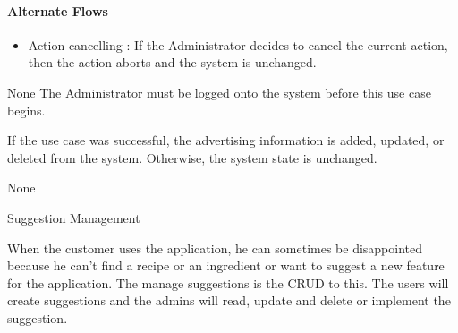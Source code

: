 {  \paragraph{Alternate Flows}
  \begin{itemize}
    \item Action cancelling : If the Administrator decides to cancel the current action, then the action aborts and the system is unchanged.
  \end{itemize}
}
{
  None
}
{
  The Administrator must be logged onto the system before this use case begins.
}
{
  If the use case was successful, the advertising information is added, updated, or deleted from the system. Otherwise, the system state is unchanged.

}
{
  None
}

\usecasedesc
{
  Suggestion Management \label{sec:suggestionManagement}
}
{
  When the customer uses the application, he can sometimes be disappointed because he can’t find a recipe or an ingredient or want to suggest a new feature for the application. The manage suggestions is the CRUD to this. The users will create suggestions and the admins will read, update and delete or implement the suggestion.

}
